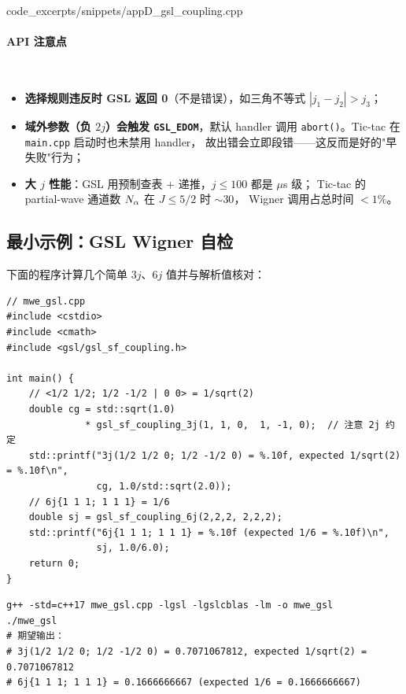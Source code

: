 
{code_excerpts/snippets/appD_gsl_coupling.cpp}

\paragraph{API 注意点}\

\begin{itemize}
\item \textbf{选择规则违反时 GSL 返回 0}（不是错误），如三角不等式
      $|j_1-j_2|>j_3$；
\item \textbf{域外参数（负 $2j$）会触发 \texttt{GSL\_EDOM}}，默认 handler 调用
      \texttt{abort()}。Tic-tac 在 \texttt{main.cpp} 启动时也未禁用 handler，
      故出错会立即段错——这反而是好的"早失败"行为；
\item \textbf{大 $j$ 性能}：GSL 用预制查表 + 递推，$j\le 100$ 都是 $\mu$s 级；
      Tic-tac 的 partial-wave 通道数 $N_\alpha$ 在 $J\le 5/2$ 时 $\sim 30$，
      Wigner 调用占总时间 $<1\%$。
\end{itemize}

\subsection{最小示例：GSL Wigner 自检}

下面的程序计算几个简单 $3j$、$6j$ 值并与解析值核对：

\begin{lstlisting}[style=cpp,caption={GSL Wigner 最小工作示例。}]
// mwe_gsl.cpp
#include <cstdio>
#include <cmath>
#include <gsl/gsl_sf_coupling.h>

int main() {
    // <1/2 1/2; 1/2 -1/2 | 0 0> = 1/sqrt(2)
    double cg = std::sqrt(1.0)
              * gsl_sf_coupling_3j(1, 1, 0,  1, -1, 0);  // 注意 2j 约定
    std::printf("3j(1/2 1/2 0; 1/2 -1/2 0) = %.10f, expected 1/sqrt(2) = %.10f\n",
                cg, 1.0/std::sqrt(2.0));
    // 6j{1 1 1; 1 1 1} = 1/6
    double sj = gsl_sf_coupling_6j(2,2,2, 2,2,2);
    std::printf("6j{1 1 1; 1 1 1} = %.10f (expected 1/6 = %.10f)\n",
                sj, 1.0/6.0);
    return 0;
}
\end{lstlisting}

\begin{lstlisting}[style=config,caption={编译 \& 运行。}]
g++ -std=c++17 mwe_gsl.cpp -lgsl -lgslcblas -lm -o mwe_gsl
./mwe_gsl
# 期望输出：
# 3j(1/2 1/2 0; 1/2 -1/2 0) = 0.7071067812, expected 1/sqrt(2) = 0.7071067812
# 6j{1 1 1; 1 1 1} = 0.1666666667 (expected 1/6 = 0.1666666667)
\end{lstlisting}


